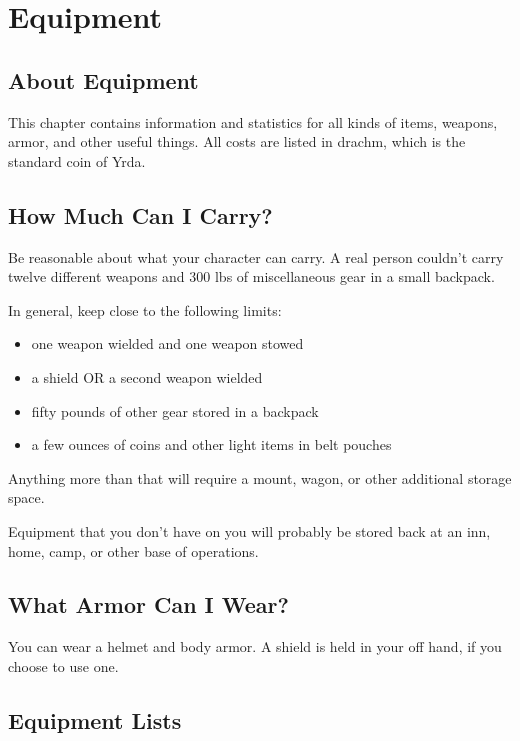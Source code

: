 \chapter{Equipment}

\begin{multicols}{2}

\section{About Equipment}

This chapter contains information and statistics for all kinds 
of items, weapons, armor, and other useful things. All costs
are listed in drachm, which is the standard coin of Yrda.

\section{How Much Can I Carry?}

Be reasonable about what your character can carry. A real person
couldn't carry twelve different weapons and 300 lbs of miscellaneous
gear in a small backpack.

In general, keep close to the following limits:

\begin{itemize}
    \item one weapon wielded and one weapon stowed
    \item a shield OR a second weapon wielded
    \item fifty pounds of other gear stored in a backpack
    \item a few ounces of coins and other light items in belt pouches
\end{itemize}

Anything more than that will require a mount, wagon, or other
additional storage space.

Equipment that you don't have on you will probably be stored
back at an inn, home, camp, or other base of operations.

\section{What Armor Can I Wear?}

You can wear a helmet and body armor. A shield is held in your
off hand, if you choose to use one.

\section{Equipment Lists}


\end{multicols}
